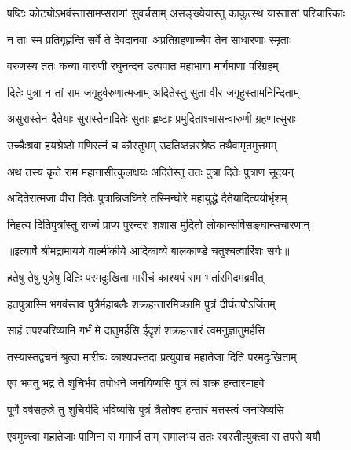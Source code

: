\twolineshloka
{षष्टिः कोट्योऽभवंस्तासामप्सराणां सुवर्चसाम्}
{असङ्ख्येयास्तु काकुत्स्थ यास्तासां परिचारिकाः} %

\twolineshloka
{न ताः स्म प्रतिगृह्णन्ति सर्वे ते देवदानवाः}
{अप्रतिग्रहणाच्चैव तेन साधारणाः स्मृताः} %

\twolineshloka
{वरुणस्य ततः कन्या वारुणी रघुनन्दन}
{उत्पपात महाभागा मार्गमाणा परिग्रहम्} %

\twolineshloka
{दितेः पुत्रा न तां राम जगृहुर्वरुणात्मजाम्}
{अदितेस्तु सुता वीर जगृहुस्तामनिन्दिताम्} %

\twolineshloka
{असुरास्तेन दैतेयाः सुरास्तेनादितेः सुताः}
{हृष्टाः प्रमुदिताश्चासन्वारुणी ग्रहणात्सुराः} %

\twolineshloka
{उच्चैःश्रवा हयश्रेष्ठो मणिरत्नं च कौस्तुभम्}
{उदतिष्ठन्नरश्रेष्ठ तथैवामृतमुत्तमम्} %

\twolineshloka
{अथ तस्य कृते राम महानासीत्कुलक्षयः}
{अदितेस्तु ततः पुत्रा दितेः पुत्राण सूदयन्} %

\twolineshloka
{अदितेरात्मजा वीरा दितेः पुत्रान्निजघ्निरे}
{तस्मिन्घोरे महायुद्धे दैतेयादित्ययोर्भृशम्} %

\twolineshloka
{निहत्य दितिपुत्रांस्तु राज्यं प्राप्य पुरन्दरः}
{शशास मुदितो लोकान्सर्षिसङ्घान्सचारणान्} %


{॥इत्यार्षे श्रीमद्रामायणे वाल्मीकीये आदिकाव्ये बालकाण्डे चतुश्चत्वारिंशः सर्गः॥}


\twolineshloka
{हतेषु तेषु पुत्रेषु दितिः परमदुःखिता}
{मारीचं काश्यपं राम भर्तारमिदमब्रवीत्} %

\twolineshloka
{हतपुत्रास्मि भगवंस्तव पुत्रैर्महाबलैः}
{शक्रहन्तारमिच्छामि पुत्रं दीर्घतपोऽर्जितम्} %

\twolineshloka
{साहं तपश्चरिष्यामि गर्भं मे दातुमर्हसि}
{ईदृशं शक्रहन्तारं त्वमनुज्ञातुमर्हसि} %

\twolineshloka
{तस्यास्तद्वचनं श्रुत्वा मारीचः काश्यपस्तदा}
{प्रत्युवाच महातेजा दितिं परमदुःखिताम्} %

\twolineshloka
{एवं भवतु भद्रं ते शुचिर्भव तपोधने}
{जनयिष्यसि पुत्रं त्वं शक्र हन्तारमाहवे} %

\twolineshloka
{पूर्णे वर्षसहस्रे तु शुचिर्यदि भविष्यसि}
{पुत्रं त्रैलोक्य हन्तारं मत्तस्त्वं जनयिष्यसि} %

\twolineshloka
{एवमुक्त्वा महातेजाः पाणिना स ममार्ज ताम्}
{समालभ्य ततः स्वस्तीत्युक्त्वा स तपसे ययौ} %


